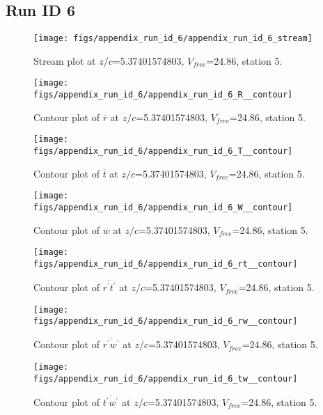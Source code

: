 \subsection{Run ID 6}
\begin{figure}[H]
\centering
\texttt{[image: figs/appendix\_run\_id\_6/appendix\_run\_id\_6\_stream]}
\caption{Stream plot at $z/c$=5.37401574803, $V_{free}$=24.86, station 5.}
\label{fig:appendix_run_id_6_stream}
\end{figure}


\begin{figure}[H]
\centering
\texttt{[image: figs/appendix\_run\_id\_6/appendix\_run\_id\_6\_R\_\_contour]}
\caption{Contour plot of $\overline{r}$ at $z/c$=5.37401574803, $V_{free}$=24.86, station 5.}
\label{fig:appendix_run_id_6_R__contour}
\end{figure}


\begin{figure}[H]
\centering
\texttt{[image: figs/appendix\_run\_id\_6/appendix\_run\_id\_6\_T\_\_contour]}
\caption{Contour plot of $\overline{t}$ at $z/c$=5.37401574803, $V_{free}$=24.86, station 5.}
\label{fig:appendix_run_id_6_T__contour}
\end{figure}


\begin{figure}[H]
\centering
\texttt{[image: figs/appendix\_run\_id\_6/appendix\_run\_id\_6\_W\_\_contour]}
\caption{Contour plot of $\overline{w}$ at $z/c$=5.37401574803, $V_{free}$=24.86, station 5.}
\label{fig:appendix_run_id_6_W__contour}
\end{figure}


\begin{figure}[H]
\centering
\texttt{[image: figs/appendix\_run\_id\_6/appendix\_run\_id\_6\_rt\_\_contour]}
\caption{Contour plot of $\overline{r^\prime t^\prime}$ at $z/c$=5.37401574803, $V_{free}$=24.86, station 5.}
\label{fig:appendix_run_id_6_rt__contour}
\end{figure}


\begin{figure}[H]
\centering
\texttt{[image: figs/appendix\_run\_id\_6/appendix\_run\_id\_6\_rw\_\_contour]}
\caption{Contour plot of $\overline{r^\prime w^\prime}$ at $z/c$=5.37401574803, $V_{free}$=24.86, station 5.}
\label{fig:appendix_run_id_6_rw__contour}
\end{figure}


\begin{figure}[H]
\centering
\texttt{[image: figs/appendix\_run\_id\_6/appendix\_run\_id\_6\_tw\_\_contour]}
\caption{Contour plot of $\overline{t^\prime w^\prime}$ at $z/c$=5.37401574803, $V_{free}$=24.86, station 5.}
\label{fig:appendix_run_id_6_tw__contour}
\end{figure}


